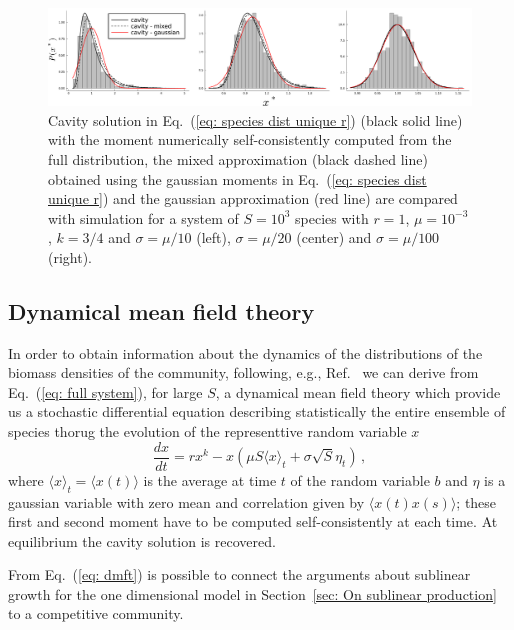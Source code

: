 \documentclass[10pt]{article}
\begin{document}
\begin{figure}[h!]
    \centering
    \includegraphics[width=1\textwidth]{fig/SM-cavity+mixed+gaussian.pdf}
    \caption{Cavity solution in Eq.~(\ref{eq: species dist unique r}) (black solid line) with the
    moment numerically self-consistently computed from the full distribution, 
    the mixed approximation (black dashed line) obtained using the 
    gaussian moments in  Eq.~(\ref{eq: species dist unique r}) and the gaussian approximation (red line)
    are compared with simulation for a system 
    of $S=10^3$ species with
    $r=1$, $\mu=10^{-3}$, $k=3/4$ and $\sigma=\mu/10$ (left),
    $\sigma=\mu/20$ (center) and $\sigma=\mu/100$ (right).}
    \label{fig: SM cavity + mixed + gauss}
\end{figure}

\subsection{Dynamical mean field theory}
In order to obtain information about the dynamics
of the distributions of the biomass densities of the community,
following, e.g., Ref.~\cite{Roy2019} we can derive
from Eq.~(\ref{eq: full system}), for large $S$, 
a dynamical mean field theory which provide us a stochastic differential
equation describing statistically the entire ensemble of species
thorug the evolution of the representtive random variable $x$
\begin{equation}
    \frac{d x}{dt} = rx^k -
     x\left(\mu S \langle x \rangle_t + \sigma \sqrt{S} \eta_t \right)\, ,
\label{eq: dmft}
\end{equation}
where $\langle x\rangle_t=\langle x(t)\rangle$ is the average at time $t$ of the random variable
$b$ and $\eta$ is a gaussian variable
with zero mean and correlation given by $\langle x(t)x(s)\rangle$; these first and
second moment have to be computed self-consistently at each time. 
At equilibrium the cavity solution is recovered.

From Eq.~(\ref{eq: dmft}) is possible to connect the arguments about
sublinear growth for the one dimensional model in 
Section~\ref{sec: On sublinear production}
to a competitive community.
\end{document}
